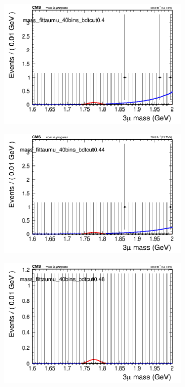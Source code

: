 \begin{figure}[H]
\begin{subfigure}{0.2\textwidth}
        \includegraphics[width=\textwidth]{power_law/plots/taumu/massfit_taumu_40bins_bdtcut0.4.png}
        \caption{}
    \end{subfigure}
    \begin{subfigure}{0.2\textwidth}
        \includegraphics[width=\textwidth]{power_law/plots/taumu/massfit_taumu_40bins_bdtcut0.44.png}
        \caption{}
    \end{subfigure}
    \begin{subfigure}{0.2\textwidth}
        \includegraphics[width=\textwidth]{power_law/plots/taumu/massfit_taumu_40bins_bdtcut0.48.png}

\end{subfigure}
\end{figure}
